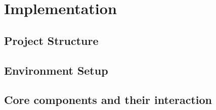 \chapter{Implementation}

\section{Project Structure}

\section{Environment Setup}

\section{Core components and their interaction}
